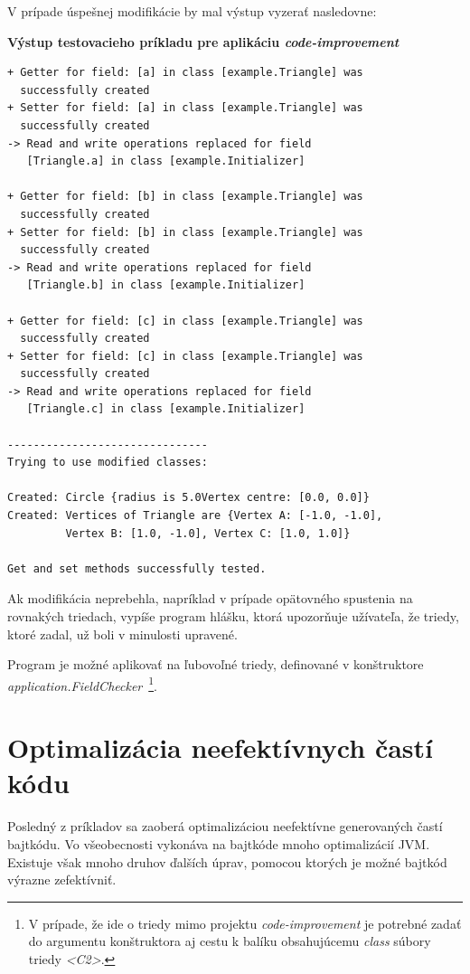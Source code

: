\documentclass[11pt,final,oneside]{fithesis}
\newenvironment{example}[1]
{
\vspace{3mm}
\noindent\textbf{#1}
\vspace{2mm}
}
{
\vspace{3mm}
}
\begin{document}
V prípade úspešnej modifikácie by mal výstup vyzerať nasledovne:

\begin{example}{Výstup testovacieho príkladu pre aplikáciu
\textit{code-improvement}}
\begin{verbatim}
+ Getter for field: [a] in class [example.Triangle] was
  successfully created
+ Setter for field: [a] in class [example.Triangle] was
  successfully created
-> Read and write operations replaced for field
   [Triangle.a] in class [example.Initializer]

+ Getter for field: [b] in class [example.Triangle] was
  successfully created
+ Setter for field: [b] in class [example.Triangle] was
  successfully created
-> Read and write operations replaced for field
   [Triangle.b] in class [example.Initializer]

+ Getter for field: [c] in class [example.Triangle] was
  successfully created
+ Setter for field: [c] in class [example.Triangle] was
  successfully created
-> Read and write operations replaced for field
   [Triangle.c] in class [example.Initializer]

-------------------------------
Trying to use modified classes: 

Created: Circle {radius is 5.0Vertex centre: [0.0, 0.0]}
Created: Vertices of Triangle are {Vertex A: [-1.0, -1.0],
         Vertex B: [1.0, -1.0], Vertex C: [1.0, 1.0]}

Get and set methods successfully tested.
\end{verbatim}
\end{example}

Ak modifikácia neprebehla, napríklad v prípade opätovného spustenia na 
rovnakých triedach, vypíše program hlášku, ktorá upozorňuje užívateľa, že 
triedy, ktoré zadal, už boli v minulosti upravené.

Program je možné aplikovať na ľubovoľné triedy, definované v konštruktore
\textit{application.FieldChecker}~\footnote{V prípade, že ide o triedy mimo 
projektu \textit{code-improvement} je potrebné zadať do argumentu konštruktora 
aj cestu k balíku obsahujúcemu \textit{class} súbory triedy \textit{<C2>}.}.

\section{Optimalizácia neefektívnych častí kódu}
Posledný z príkladov sa zaoberá optimalizáciou neefektívne generovaných častí 
bajtkódu. Vo všeobecnosti vykonáva na bajtkóde mnoho optimalizácií JVM. 
Existuje však mnoho druhov ďalších úprav, pomocou ktorých je možné bajtkód 
výrazne zefektívniť.
\end{document}
